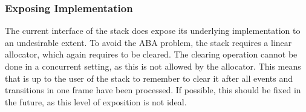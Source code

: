\subsubsection{Exposing Implementation}
The current interface of the stack does expose its underlying implementation to an undesirable extent.
To avoid the ABA problem, the stack requires a linear allocator, which again requires
to be cleared.
The clearing operation cannot be done in a concurrent setting, as this is not allowed by the allocator.
This means that is up to the user of the stack to remember to clear it after all events and transitions in one frame have been processed.
If possible, this should be fixed in the future, as this level of exposition is not ideal.
